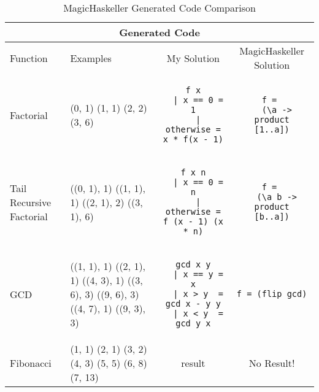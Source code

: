 \begin{table}[h!]
\centering
\begin{tabular}{| m{4em} | m{5em} | c | c |}
\hline
\multicolumn{4}{|c|}{\textbf{Generated Code}} \\
\hline
Function & Examples & My Solution & MagicHaskeller Solution \\
\hline
Factorial 
& 
(0, 1) \newline
(1, 1) \newline
(2, 2) \newline
(3, 6)
&
\begin{lstlisting}
f x
  | x == 0 = 1
  | otherwise = x * f(x - 1)
\end{lstlisting}
& 
\begin{lstlisting}
f = 
  (\a -> product [1..a])
\end{lstlisting}
\\
\hline
\mbox{}\newline
Tail \newline
Recursive \newline
Factorial \newline
& 
((0, 1), 1) \newline
((1, 1), 1) \newline
((2, 1), 2) \newline
((3, 1), 6)
&
\begin{lstlisting}
f x n
  | x == 0 = n
  | otherwise = f (x - 1) (x * n)
\end{lstlisting}
& 
\begin{lstlisting}
f = 
  (\a b -> product [b..a])
\end{lstlisting}
\\
\hline
GCD
&
((1, 1), 1) \newline
((2, 1), 1) \newline
((4, 3), 1) \newline
((3, 6), 3) \newline
((9, 6), 3) \newline
((4, 7), 1) \newline
((9, 3), 3) 
&
\begin{lstlisting}
gcd x y
  | x == y = x
  | x > y  = gcd x - y y
  | x < y  = gcd y x
\end{lstlisting}	
&
\begin{lstlisting}
f = (flip gcd)
\end{lstlisting}
\\
\hline
Fibonacci
&
(1, 1) \newline
(2, 1) \newline
(3, 2) \newline
(4, 3) \newline
(5, 5) \newline
(6, 8) \newline
(7, 13) 
&
result
&
No Result!
\\
\hline
\end{tabular}
\caption{MagicHaskeller Generated Code Comparison }
\label{table:1}
\end{table}

